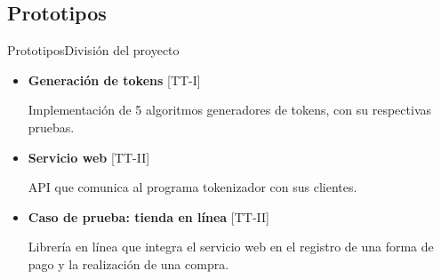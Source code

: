 %
%
%

\subsection{Prototipos}

\begin{frame}{Prototipos}{División del proyecto}

  \begin{itemize}
    \item \textbf{Generación de tokens} [TT-I]

      Implementación de 5 algoritmos generadores de tokens, con su
      respectivas pruebas.
      \newline

    \item \textbf{Servicio web} [TT-II]

      API que comunica al programa tokenizador con sus clientes.
      \newline

    \item \textbf{Caso de prueba: tienda en línea} [TT-II]

      Librería en línea que integra el servicio web en el registro
      de una forma de pago y la realización de una compra.
      \newline

  \end{itemize}


\end{frame}
